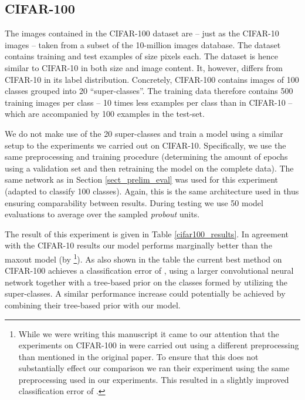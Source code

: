 \documentclass{article} \pdfoutput=1
\begin{document}
\subsection{CIFAR-100}
The images contained in the CIFAR-100 dataset \cite{Krizhevsky2009}
are -- just as the CIFAR-10 images -- taken from a subset of the
10-million images database. The dataset contains  training and
 test examples of size  pixels each. The dataset
is hence similar to CIFAR-10 in both size and image content. It,
however, differs from CIFAR-10 in its label distribution. Concretely,
CIFAR-100 contains images of 100 classes grouped into 20
``super-classes''. The training data therefore contains 500 training
images per class -- 10 times less examples per class than in
CIFAR-10 -- which are accompanied by 100 examples in the test-set.

We do not make use of the 20 super-classes and train a model using a
similar setup to the experiments we carried out on CIFAR-10.
Specifically, we use the same preprocessing and training procedure
(determining the amount of epochs using a validation set and then
retraining the model on the complete data). The same network as in
Section \ref{sect_prelim_eval} was used for this experiment (adapted
to classify 100 classes). Again, this is the same architecture used
in \cite{Goodfellow2013} thus ensuring comparability between results.
During testing we use 50 model evaluations to average over the sampled
\emph{probout} units.

The result of this experiment is given in Table
\ref{cifar100_results}. In agreement with the CIFAR-10 results our
model performs marginally better than the maxout model (by \footnote{While we were
  writing this manuscript it came to our attention that the
  experiments on CIFAR-100 in \cite{Goodfellow2013} were carried out
  using a different preprocessing than mentioned in the original paper. To
  ensure that this does not substantially effect our comparison we ran
  their experiment using the same preprocessing used in our
  experiments. This resulted in a slightly improved classification
  error of .}). As
also shown in the table the current best method on CIFAR-100 achieves
a classification error of  \cite{Nitish2013}, using a larger
convolutional neural network together with a tree-based prior on the
classes formed by utilizing the super-classes. A similar
performance increase could potentially be achieved by combining their
tree-based prior with our model.
\end{document}
